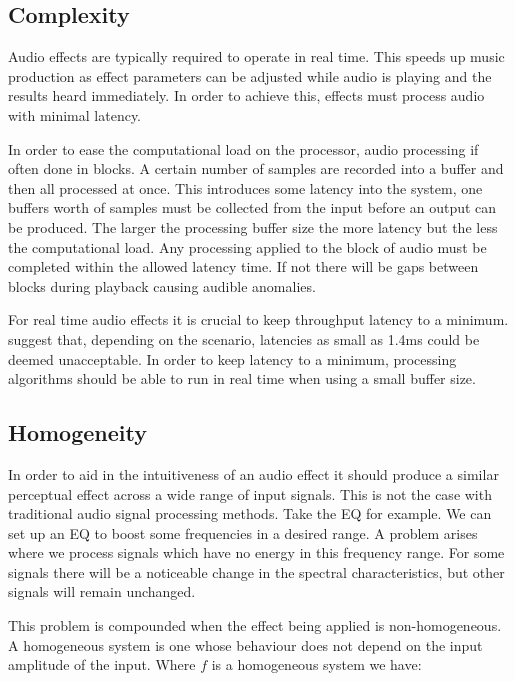 	\subsection{Complexity}
	\label{sec:Excitation-Evaluation-Complexity}
		Audio effects are typically required to operate in real time. This speeds up music production as effect
		parameters can be adjusted while audio is playing and the results heard immediately. In order to achieve
		this, effects must process audio with minimal latency. 

		In order to ease the computational load on the processor, audio processing if often done in blocks. A
		certain number of samples are recorded into a buffer and then all processed at once. This introduces some
		latency into the system, one buffers worth of samples must be collected from the input before an output can
		be produced. The larger the processing buffer size the more latency but the less the computational load. Any
		processing applied to the block of audio must be completed within the allowed latency time. If not there
		will be gaps between blocks during playback causing audible anomalies.

		For real time audio effects it is crucial to keep throughput latency to a minimum. \citet{lester2007the}
		suggest that, depending on the scenario, latencies as small as 1.4ms could be deemed unacceptable. In order
		to keep latency to a minimum, processing algorithms should be able to run in real time when using a small
		buffer size.

	\subsection{Homogeneity}
	\label{sec:Excitation-Evaluation-Homogeneity}
		In order to aid in the intuitiveness of an audio effect it should produce a similar perceptual effect
		across a wide range of input signals. This is not the case with traditional audio signal processing
		methods. Take the EQ for example. We can set up an EQ to boost some frequencies in a desired range. A
		problem arises where we process signals which have no energy in this frequency range. For some signals
		there will be a noticeable change in the spectral characteristics, but other signals will remain unchanged.

		This problem is compounded when the effect being applied is non-homogeneous. A homogeneous system is one
		whose behaviour does not depend on the input amplitude of the input. Where $f$ is a homogeneous system we
		have:

